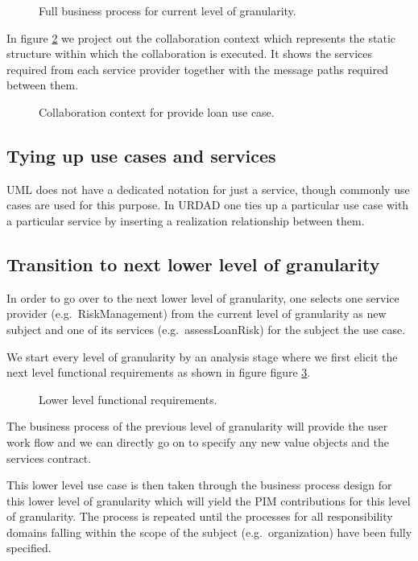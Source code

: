 \begin{figure}
  \centering
  \caption{Full business process for current level of granularity.}
  \label{fig:provideLoanBusinessProcess}
\end{figure}

In figure \ref{fig:provideLoanCollaborationContext} we project out the collaboration context
which represents the static structure within
which the collaboration is executed. It shows the services required from each service
provider together with the message paths required between them.

\begin{figure}
  \centering
  \caption{Collaboration context for provide loan use case.}
  \label{fig:provideLoanCollaborationContext}
\end{figure}



\subsection{Tying up use cases and services}

UML does not have a dedicated notation for just a service, though commonly
use cases are used for this purpose. In URDAD one ties up a particular use case
with a particular service by inserting a realization relationship between them.


\subsection{Transition to next lower level of granularity}

In order to go over to the next lower level of granularity, one selects one
service provider (e.g.\ RiskManagement) from the current level of granularity as new
subject and one of its services (e.g.\ assessLoanRisk) for the subject the use case.

We start every level of granularity by an analysis stage where we first elicit the next level functional requirements as shown in figure figure \ref{fig:assessLoanRiskFunctionalRequirements}.

\begin{figure}
  \centering
  \caption{Lower level functional requirements.}
  \label{fig:assessLoanRiskFunctionalRequirements}
\end{figure}

The business process of the previous level of granularity will provide
the user work flow and we can directly go on to specify any new value objects
and the services contract.

This lower level use case is then taken through the business process design for this
lower level of granularity which will yield the PIM contributions for this level of granularity.
The process is repeated until the processes for all responsibility domains falling within
the scope of the subject (e.g.\ organization) have been fully specified.